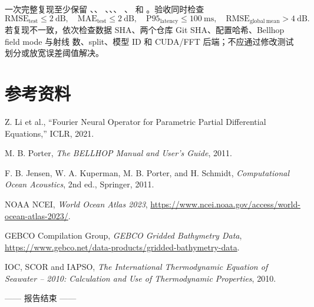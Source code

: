 \documentclass[UTF8,11pt]{ctexart}
\newcommand{\RMSE}{\mathrm{RMSE}}
\begin{document}
一次完整复现至少保留 、、
、、、
、 和
。验收同时检查
\begin{equation}
  \RMSE_{\mathrm{test}}\le2\ \mathrm{dB},\quad
  \mathrm{MAE}_{\mathrm{test}}\le2\ \mathrm{dB},\quad
  \mathrm{P95}_{\mathrm{latency}}\le100\ \mathrm{ms},\quad
  \RMSE_{\mathrm{global\ mean}}>4\ \mathrm{dB}.
\end{equation}
若复现不一致，依次检查数据 SHA、两个仓库 Git SHA、配置哈希、Bellhop field mode 与射线
数、split、模型 ID 和 CUDA/FFT 后端；不应通过修改测试划分或放宽误差阈值解决。

\section{参考资料}

\begin{enumerate}[label={[\arabic*]}]
  \item Z. Li et al., ``Fourier Neural Operator for Parametric Partial Differential Equations,''
  ICLR, 2021.
  \item M. B. Porter, \textit{The BELLHOP Manual and User's Guide}, 2011.
  \item F. B. Jensen, W. A. Kuperman, M. B. Porter, and H. Schmidt,
  \textit{Computational Ocean Acoustics}, 2nd ed., Springer, 2011.
  \item NOAA NCEI, \textit{World Ocean Atlas 2023},
  \url{https://www.ncei.noaa.gov/access/world-ocean-atlas-2023/}.
  \item GEBCO Compilation Group, \textit{GEBCO Gridded Bathymetry Data},
  \url{https://www.gebco.net/data-products/gridded-bathymetry-data}.
  \item IOC, SCOR and IAPSO, \textit{The International Thermodynamic Equation of Seawater
  -- 2010: Calculation and Use of Thermodynamic Properties}, 2010.
\end{enumerate}

\vfill
\begin{center}
\color{gray}\small —— 报告结束 ——
\end{center}
\end{document}
